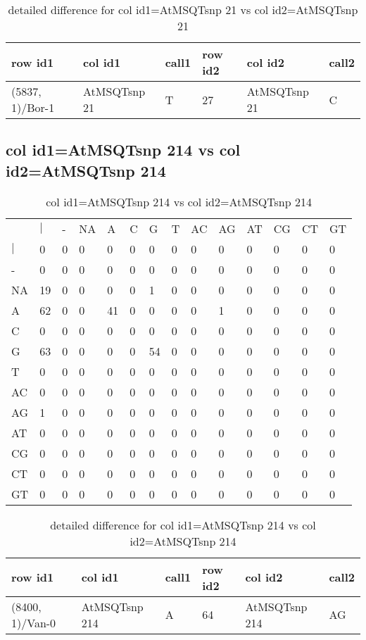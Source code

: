 \begin{center}
\begin{longtable}{|l|l|l|l|l|l|}
\caption{detailed difference for col id1=AtMSQTsnp 21 vs col id2=AtMSQTsnp 21} \label{table_dm577}\\
\hline
row id1&col id1&call1&row id2&col id2&call2\\
\hline
(5837, 1)/Bor-1&AtMSQTsnp 21&T&27&AtMSQTsnp 21&C\\
\hline
\end{longtable}
\end{center}

\subsection{col id1=AtMSQTsnp 214 vs col id2=AtMSQTsnp 214}
\begin{center}
\begin{longtable}{|l|l|l|l|l|l|l|l|l|l|l|l|l|l|}
\caption{col id1=AtMSQTsnp 214 vs col id2=AtMSQTsnp 214} \label{table_dm578}\\
\hline
\\
\hline
&$|$&-&NA&A&C&G&T&AC&AG&AT&CG&CT&GT\\
$|$&0&0&0&0&0&0&0&0&0&0&0&0&0\\
-&0&0&0&0&0&0&0&0&0&0&0&0&0\\
NA&19&0&0&0&0&1&0&0&0&0&0&0&0\\
A&62&0&0&41&0&0&0&0&1&0&0&0&0\\
C&0&0&0&0&0&0&0&0&0&0&0&0&0\\
G&63&0&0&0&0&54&0&0&0&0&0&0&0\\
T&0&0&0&0&0&0&0&0&0&0&0&0&0\\
AC&0&0&0&0&0&0&0&0&0&0&0&0&0\\
AG&1&0&0&0&0&0&0&0&0&0&0&0&0\\
AT&0&0&0&0&0&0&0&0&0&0&0&0&0\\
CG&0&0&0&0&0&0&0&0&0&0&0&0&0\\
CT&0&0&0&0&0&0&0&0&0&0&0&0&0\\
GT&0&0&0&0&0&0&0&0&0&0&0&0&0\\
\hline
\end{longtable}
\end{center}

\begin{center}
\begin{longtable}{|l|l|l|l|l|l|}
\caption{detailed difference for col id1=AtMSQTsnp 214 vs col id2=AtMSQTsnp 214} \label{table_dm579}\\
\hline
row id1&col id1&call1&row id2&col id2&call2\\
\hline
(8400, 1)/Van-0&AtMSQTsnp 214&A&64&AtMSQTsnp 214&AG\\
\hline
\end{longtable}
\end{center}

